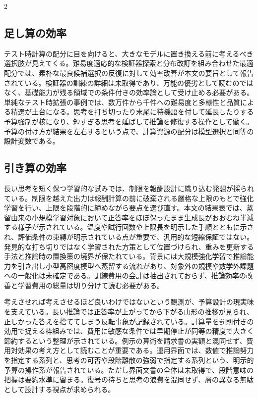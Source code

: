 \documentclass[lualatex,a4paper,10pt]{jlreq}
\begin{document}
\begin{multicols}{2}
\subsection{足し算の効率}
テスト時計算の配分に目を向けると、大きなモデルに置き換える前に考えるべき選択肢が見えてくる。難易度適応的な検証器探索と分布改訂を組み合わせた最適配分では、素朴な最良候補選択の反復に対して効率改善が本文の要旨として報告されている\autocite{snell2024}。検証器の訓練の詳細は未取得であり、万能の優劣として読むのではなく、基礎能力が残る領域での条件付きの効率論として受け止める必要がある。単純なテスト時拡張の事例では、数万件から千件への難易度と多様性と品質による精選が土台になる\autocite{s1}。思考を打ち切ったり末尾に待機語を付して延長したりする予算強制が核になり、短すぎる思考を延ばして推論を修復する操作として働く。予算の付け方が結果を左右するという点で、計算資源の配分は模型選択と同等の設計変数である。

\subsection{引き算の効率}
長い思考を短く保つ学習的な試みでは、制限を報酬設計に織り込む発想が採られている\autocite{thinkprune}。制限を越えた出力は報酬計算の前に破棄される厳格な上限のもとで強化学習を行い、上限を段階的に締めながら要点を選び直す。本文の結果表では、蒸留由来の小規模学習対象において正答率をほぼ保ったまま生成長がおおむね半減する様子が示されている。温度や試行回数や上限長を明示した手順とともに示され、評価条件の束縛が明示されている点が重要で、汎用的な短縮保証ではない。発見的な打ち切りではなく学習された方策として位置づけられ、重みを更新する手法と推論時の置換策の境界が保たれている。背景には大規模強化学習で推論能力を引き出し小型高密度模型へ蒸留する流れがあり\autocite{r1}、対象外の規模や数学外課題への一般化は未確定である。訓練費用の会計は抽出されておらず、推論効率の改善と学習費用の総量は切り分けて読む必要がある。

考えさせれば考えさせるほど良いわけではないという観測が、予算設計の現実味を支えている\autocite{overthink}。長い推論では正答率が上がってから下がる山形の推移が見られ、正しかった答えを捨ててしまう反転事象が記録されている。計算量を罰則付きの効用で捉える枠組みでは、費用に敏感な条件では早期停止が同等の精度で大きく節約するという整理が示されている。例示の算術を請求書の実額と混同せず、費用対効果の考え方として読むことが重要である。運用界面では、数値で推論努力を指定する系列と、思考の可否や段階離散の強弱で指定する系列という、明示的予算の操作系が報告されている\autocite{effortbind}。ただし界面文書の全体は未取得で、段階意味の把握は要約水準に留まる。復号の待ちと思考の浪費を混同せず、層の異なる無駄として設計する視点が求められる。


\end{multicols}
\end{document}
